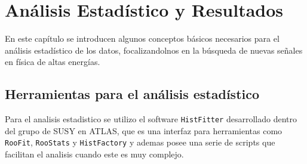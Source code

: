 \chapter{Análisis Estadístico y Resultados}

En este capítulo se introducen algunos conceptos básicos necesarios
para el análisis estadístico de los datos, focalizandolnos en la
búsqueda de nuevas se\~nales en física de altas energías.


\section{Herramientas para el análisis estadístico}

Para el analisis estadistico se utilizo el software \texttt{HistFitter}
desarrollado dentro del grupo de SUSY en ATLAS, que es una interfaz para herramientas
como \texttt{RooFit}, \texttt{RooStats}\cite{Moneta:2010pm} y \texttt{HistFactory}
\cite{Cranmer:1456844} y ademas posee una serie de scripts que facilitan el analisis cuando este
es muy complejo.







